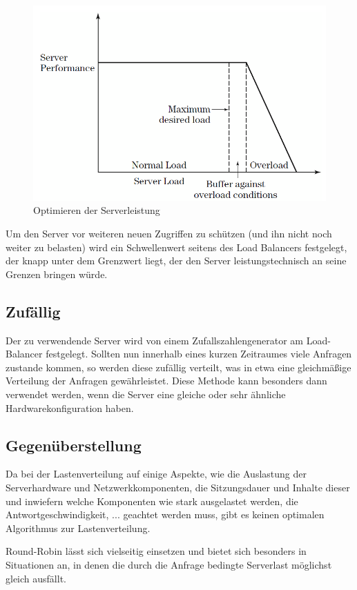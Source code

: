 \begin{figure}[!h]
	\begin{center}
		\includegraphics[width=0.5\linewidth]{images/LoadBalancing_LoadThreshold.png}
		\caption{Optimieren der Serverleistung \cite{LoadBalancing2}}
		\label{ServerTheshold}
	\end{center}
\end{figure}

Um den Server vor weiteren neuen Zugriffen zu schützen (und ihn nicht noch weiter zu belasten) wird ein Schwellenwert seitens des Load Balancers festgelegt, der knapp unter dem Grenzwert liegt, der den Server leistungstechnisch an seine Grenzen bringen würde. \cite{LoadBalancing2}

\subsection{Zufällig}
\label{sec:Zufällig}
Der zu verwendende Server wird von einem Zufallszahlengenerator am Load-Balancer festgelegt. Sollten nun innerhalb eines kurzen Zeitraumes viele Anfragen zustande kommen, so werden diese zufällig verteilt, was in etwa eine gleichmäßige Verteilung der Anfragen gewährleistet.
Diese Methode kann besonders dann verwendet werden, wenn die Server eine gleiche oder sehr ähnliche Hardwarekonfiguration haben. \cite{WeightedLoadBalancingGrafik}

\subsection{Gegenüberstellung}
\label{sec:Gegenüberstellung}
Da bei der Lastenverteilung auf einige Aspekte, wie die Auslastung der Serverhardware und Netzwerkkomponenten, die Sitzungsdauer und Inhalte dieser und inwiefern welche Komponenten wie stark ausgelastet werden, die Antwortgeschwindigkeit, ... geachtet werden muss, gibt es keinen optimalen Algorithmus zur Lastenverteilung. \cite{LoadBalancing2}

Round-Robin lässt sich vielseitig einsetzen und bietet sich besonders in Situationen an, in denen die durch die Anfrage bedingte Serverlast möglichst gleich ausfällt.
 
